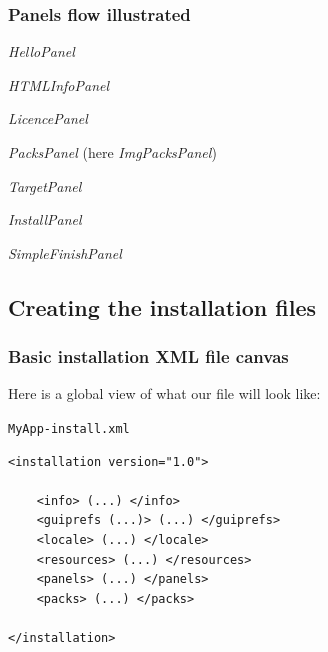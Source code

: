 \documentclass[compress,10pt]{beamer}
\begin{document}
\begin{frame}

\frametitle{Panels flow illustrated}

\begin{overprint}

  \textsl{HelloPanel}\\
  
  
  \textsl{HTMLInfoPanel}\\
  
  
  \textsl{LicencePanel}\\
  
  
  \textsl{PacksPanel} (here \textit{ImgPacksPanel})\\
  
  
  \textsl{TargetPanel}\\
  
  
  \textsl{InstallPanel}\\
  
  
  \textsl{SimpleFinishPanel}\\
  

\end{overprint}

\end{frame}


\subsection{Creating the installation files}

\begin{frame}[containsverbatim]

\frametitle{Basic installation XML file canvas}

Here is a global view of what our file will look like:

\begin{block}{\texttt{MyApp-install.xml}}
\small
\begin{verbatim}
<installation version="1.0">

    <info> (...) </info>
    <guiprefs (...)> (...) </guiprefs>
    <locale> (...) </locale>
    <resources> (...) </resources>
    <panels> (...) </panels>
    <packs> (...) </packs>

</installation>
\end{verbatim}
\end{block}

\end{frame}
\end{document}
